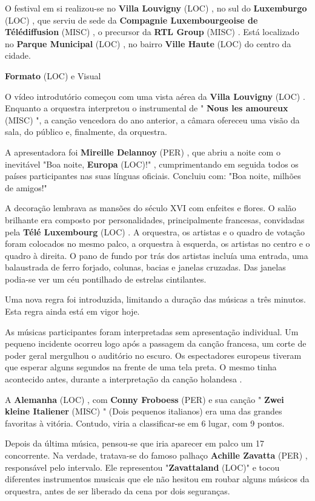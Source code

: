 \documentclass[12pt,a4paper]{article}
\begin{document}
O festival em si realizou-se no \textbf{Villa Louvigny} (LOC) , no sul do \textbf{Luxemburgo} (LOC) , que serviu de sede da \textbf{Compagnie Luxembourgeoise de Télédiffusion} (MISC) , o precursor da \textbf{RTL Group} (MISC) . Está localizado no \textbf{Parque Municipal} (LOC) , no bairro \textbf{Ville Haute} (LOC) do centro da cidade.



\textbf{Formato} (LOC) e Visual

O vídeo introdutório começou com uma vista aérea da \textbf{Villa Louvigny} (LOC) . Enquanto a orquestra interpretou o instrumental de " \textbf{Nous les amoureux} (MISC) ", a canção vencedora do ano anterior, a câmara ofereceu uma visão da sala, do público e, finalmente, da orquestra.

A apresentadora foi \textbf{Mireille Delannoy} (PER) , que abriu a noite com o inevitável "Boa noite, \textbf{Europa} (LOC)!" , cumprimentando em seguida todos os países participantes nas suas línguas oficiais. Concluiu com: "Boa noite, milhões de amigos!"

A decoração lembrava as mansões do século XVI com enfeites e flores. O salão brilhante era composto por personalidades, principalmente francesas, convidadas pela \textbf{Télé Luxembourg} (LOC) . A orquestra, os artistas e o quadro de votação foram colocados no mesmo palco, a orquestra à esquerda, os artistas no centro e o quadro à direita. O pano de fundo por trás dos artistas incluía uma entrada, uma balaustrada de ferro forjado, colunas, bacias e janelas cruzadas. Das janelas podia-se ver um céu pontilhado de estrelas cintilantes.

Uma nova regra foi introduzida, limitando a duração das músicas a três minutos. Esta regra ainda está em vigor hoje.

As músicas participantes foram interpretadas sem apresentação individual. Um pequeno incidente ocorreu logo após a passagem da canção francesa, um corte de poder geral mergulhou o auditório no escuro. Os espectadores europeus tiveram que esperar alguns segundos na frente de uma tela preta. O mesmo tinha acontecido antes, durante a interpretação da canção holandesa .

A \textbf{Alemanha} (LOC) , com \textbf{Conny Froboess} (PER) e sua canção " \textbf{Zwei kleine Italiener} (MISC) " (Dois pequenos italianos) era uma das grandes favoritas à vitória. Contudo, viria a classificar-se em 6 lugar, com 9 pontos.

Depois da última música, pensou-se que iria aparecer em palco um 17 concorrente. Na verdade, tratava-se do famoso palhaço \textbf{Achille Zavatta} (PER) , responsável pelo intervalo. Ele representou "\textbf{Zavattaland} (LOC)" e tocou diferentes instrumentos musicais que ele não hesitou em roubar alguns músicos da orquestra, antes de ser liberado da cena por dois seguranças.
\end{document}
